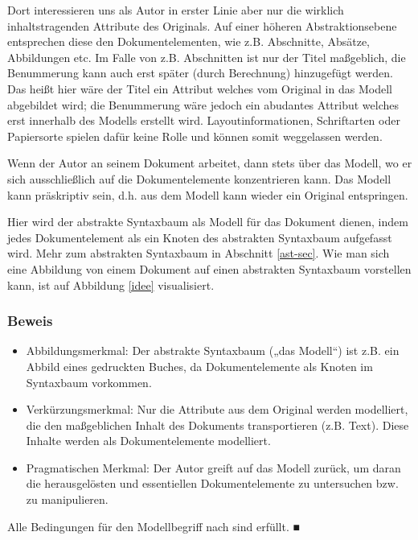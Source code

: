  
Dort interessieren uns als Autor in erster Linie aber nur die wirklich inhaltstragenden Attribute des Originals. Auf einer höheren Abstraktionsebene entsprechen diese den Dokumentelementen, wie z.B. Abschnitte, Absätze, Abbildungen etc. Im Falle von z.B. Abschnitten ist nur der Titel maßgeblich, die Benummerung kann auch erst später (durch Berechnung) hinzugefügt werden. Das heißt hier wäre der Titel ein Attribut welches vom Original in das Modell abgebildet wird; die Benummerung wäre jedoch ein abudantes Attribut welches erst innerhalb des Modells erstellt wird. Layoutinformationen, Schriftarten oder Papiersorte spielen dafür keine Rolle und können somit weggelassen werden.

 
Wenn der Autor an seinem Dokument arbeitet, dann stets über das Modell, wo er sich ausschließlich auf die Dokumentelemente konzentrieren kann. Das Modell kann präskriptiv sein, d.h. aus dem Modell kann wieder ein Original entspringen.

 
Hier wird der abstrakte Syntaxbaum als Modell für das Dokument dienen, indem jedes Dokumentelement als ein Knoten des abstrakten Syntaxbaum aufgefasst wird. Mehr zum abstrakten Syntaxbaum in Abschnitt \ref{ast-sec}. Wie man sich eine Abbildung von einem Dokument auf einen abstrakten Syntaxbaum vorstellen kann, ist auf Abbildung \ref{idee} visualisiert.

 
\subsubsection{Beweis}\label{}

 
\begin{itemize}

\item Abbildungsmerkmal: Der abstrakte Syntaxbaum („das Modell“) ist z.B. ein Abbild eines gedruckten Buches, da Dokumentelemente als Knoten im Syntaxbaum vorkommen.
\item Verkürzungsmerkmal: Nur die Attribute aus dem Original werden modelliert, die den maßgeblichen Inhalt des Dokuments transportieren (z.B. Text). Diese Inhalte werden als Dokumentelemente modelliert.
\item Pragmatischen Merkmal: Der Autor greift auf das Modell zurück, um daran die herausgelösten und essentiellen Dokumentelemente zu untersuchen bzw. zu manipulieren.
\end{itemize}
 
Alle Bedingungen für den Modellbegriff nach \citep{Stachowiak} sind erfüllt. ■


